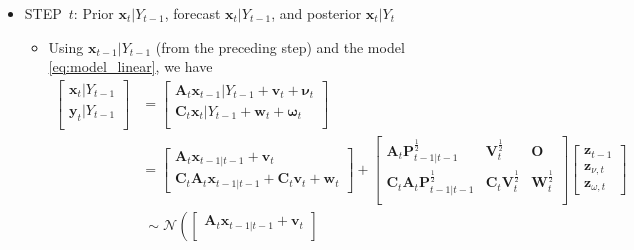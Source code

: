 \documentclass[12pt,a4paper]{article}
\begin{document}
\begin{itemize}
\begin{itemize}
\begin{itemize}
    \end{itemize}

  \item STEP~$t$:
    Prior $\bm{x}_{t}|Y_{t-1}$,
    forecast $\bm{x}_{t}|Y_{t-1}$,
    and posterior $\bm{x}_{t}|Y_{t}$

    \begin{itemize}

    \item Using $\bm{x}_{t-1}|Y_{t-1}$ (from the preceding step)
      and the model \eqref{eq:model_linear},
      we have
      \begin{align}
        \begin{bmatrix}
          \bm{x}_{t}|Y_{t-1}\\
          \bm{y}_{t}|Y_{t-1}\\
        \end{bmatrix}
        & =
          \begin{bmatrix}
            \bm{A}_{t}\bm{x}_{t-1}|Y_{t-1} + \bm{v}_{t} + \bm{\nu}_{t}\\
            \bm{C}_{t}\bm{x}_{t}|Y_{t-1} + \bm{w}_{t} + \bm{\omega}_{t}\\
          \end{bmatrix}
          \nonumber \\
        & =
          \begin{bmatrix}
            \bm{A}_{t}\bm{x}_{t-1|t-1} + \bm{v}_{t}\\
            \bm{C}_{t}\bm{A}_{t}\bm{x}_{t-1|t-1} + \bm{C}_{t}\bm{v}_{t} + \bm{w}_{t}
          \end{bmatrix}
          +
          \begin{bmatrix}
            \bm{A}_{t}\bm{P}_{t-1|t-1}^{\frac{1}{2}} & \bm{V}_{t}^{\frac{1}{2}} & \bm{O} \\
            \bm{C}_{t}\bm{A}_{t}\bm{P}_{t-1|t-1}^{\frac{1}{2}} & \bm{C}_{t}\bm{V}_{t}^{\frac{1}{2}} & \bm{W}_{t}^{\frac{1}{2}}\\
          \end{bmatrix}
          \begin{bmatrix}
            \bm{z}_{t-1}\\
            \bm{z}_{\nu,t}\\
            \bm{z}_{\omega,t}
          \end{bmatrix}
          \nonumber \\
          & ~ \sim
          \mathcal{N} \left(
          \begin{bmatrix}
            \bm{A}_{t}\bm{x}_{t-1|t-1} + \bm{v}_{t}\\

\end{bmatrix}
\end{align}
\end{itemize}
\end{itemize}
\end{itemize}
\end{document}
